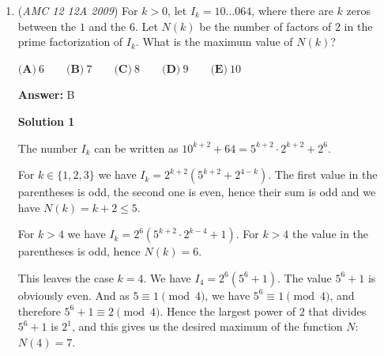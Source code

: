 \begin{enumerate}
 The sum is: $\frac{b}{1-r} = r.$ Thus, $b = r-r^2$ and by Vieta's, the sum of the two possible values of $r$ ($r_1$ and $r_2$) is $1$.

 


 \textbf{Alternate Solution} Using the formula for the sum of a geometric series we get that the sums of the given two sequences are $\frac a{1-r_1}$ and $\frac a{1-r_2}$. 

 Hence we have $\frac a{1-r_1} = r_1$ and $\frac a{1-r_2} = r_2$.This can be rewritten as $r_1(1-r_1) = r_2(1-r_2) = a$.

 Which can be further rewritten as $r_1-r_1^2 = r_2-r_2^2$.Rearranging the equation we get $r_1-r_2 = r_1^2-r_2^2$.Expressing this as a difference of squares we get $r_1-r_2 = (r_1-r_2)(r_1+r_2)$.

 Dividing by like terms we finally get $r_1+r_2 = \boxed{1}$ as desired.

 


 
Note: It is necessary to check that $r_1-r_2\ne 0$, as you cannot divide by zero. As the problem states that the series are different, $r_1 \ne r_2$, and so there is no division by zero error.

 


	\item (\textit{AMC 12 12A 2009}) For $k > 0$, let $I_k = 10\ldots 064$, where there are $k$ zeros between the $1$ and the $6$.  Let $N(k)$ be the number of factors of $2$ in the prime factorization of $I_k$.  What is the maximum value of $N(k)$?


 $\textbf{(A)}\ 6\qquad \textbf{(B)}\ 7\qquad \textbf{(C)}\ 8\qquad \textbf{(D)}\ 9\qquad \textbf{(E)}\ 10$

 \textbf{Answer: }B



\textbf{Solution 1}

The number $I_k$ can be written as $10^{k+2} + 64 = 5^{k+2}\cdot 2^{k+2} + 2^6$.

 For $k\in\{1,2,3\}$ we have $I_k = 2^{k+2} \left( 5^{k+2} + 2^{4-k} \right)$. The first value in the parentheses is odd, the second one is even, hence their sum is odd and we have $N(k)=k+2\leq 5$.

 For $k>4$ we have $I_k=2^6 \left( 5^{k+2}\cdot 2^{k-4} + 1 \right)$. For $k>4$ the value in the parentheses is odd, hence $N(k)=6$.

 This leaves the case $k=4$. We have $I_4 = 2^6 \left( 5^6 + 1 \right)$. The value $5^6 + 1$ is obviously even. And as $5\equiv 1 \pmod 4$, we have $5^6 \equiv 1 \pmod 4$, and therefore $5^6 + 1 \equiv 2 \pmod 4$. Hence the largest power of $2$ that divides $5^6+1$ is $2^1$, and this gives us the desired maximum of the function $N$: $N(4) = \boxed{7}$.


\end{enumerate}
